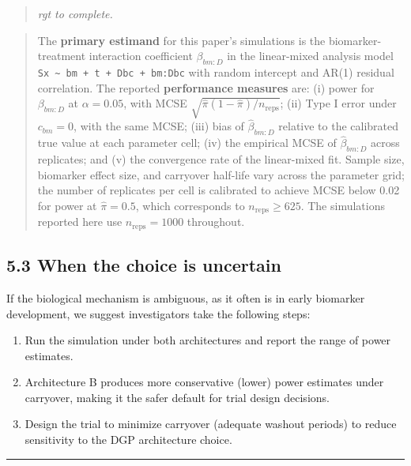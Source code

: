 \documentclass[
  11pt,
]{article}
\newenvironment{rgt}{%
  \begin{quote}\small\itshape\color[RGB]{20,60,160}}{%
  \end{quote}}
\newenvironment{orig}{%
  \begin{quote}\normalsize\color[gray]{0.55}}{%
  \end{quote}}
\begin{document}
\begin{rgt}
rgt to complete.

\end{rgt}

\begin{orig}
The \textbf{primary estimand} for this paper's simulations is the
biomarker-treatment interaction coefficient \(\beta_{bm:D}\) in the
linear-mixed analysis model
\texttt{Sx \textasciitilde{} bm + t + Dbc + bm:Dbc} with random
intercept and AR(1) residual correlation. The reported
\textbf{performance measures} are: (i) power for \(\beta_{bm:D}\) at
\(\alpha = 0.05\), with MCSE
\(\sqrt{\hat{\pi}(1-\hat{\pi})/n_{\text{reps}}}\); (ii) Type I error
under \(c_{bm} = 0\), with the same MCSE; (iii) bias of
\(\hat{\beta}_{bm:D}\) relative to the calibrated true value at each
parameter cell; (iv) the empirical MCSE of \(\hat{\beta}_{bm:D}\) across
replicates; and (v) the convergence rate of the linear-mixed fit. Sample
size, biomarker effect size, and carryover half-life vary across the
parameter grid; the number of replicates per cell is calibrated to
achieve MCSE below 0.02 for power at \(\hat{\pi} = 0.5\), which
corresponds to \(n_{\text{reps}} \geq 625\). The simulations reported
here use \(n_{\text{reps}} = 1000\) throughout.

\end{orig}

\subsection{5.3 When the choice is uncertain}

If the biological mechanism is ambiguous, as it often is in early
biomarker development, we suggest investigators take the following
steps:

\begin{enumerate}
\item Run the simulation under both architectures and report the
  range of power estimates.
\item Architecture B produces more conservative (lower)
  power estimates under carryover, making it the safer default
  for trial design decisions.
\item Design the trial to minimize carryover (adequate washout
  periods) to reduce sensitivity to the DGP architecture choice.
\end{enumerate}

\bigskip\noindent

\rule{\textwidth}{0.4pt}\bigskip
\end{document}
